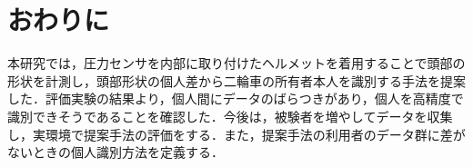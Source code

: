 \documentclass[Japanese]{dicomopapers}
\begin{document}
\section{おわりに}
本研究では，圧力センサを内部に取り付けたヘルメットを着用することで頭部の形状を計測し，頭部形状の個人差から二輪車の所有者本人を識別する手法を提案した．評価実験の結果より，個人間にデータのばらつきがあり，個人を高精度で識別できそうであることを確認した．今後は，被験者を増やしてデータを収集し，実環境で提案手法の評価をする．また，提案手法の利用者のデータ群に差がないときの個人識別方法を定義する．



\end{document}
